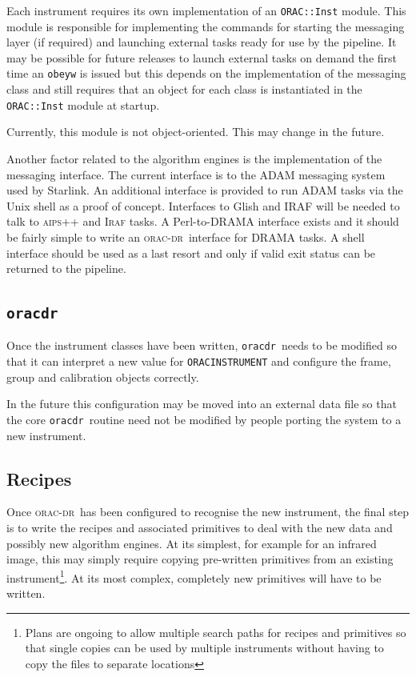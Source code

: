 \documentclass[twoside,11pt]{article}
\renewcommand{\_}{\texttt{\symbol{95}}}
\newcommand{\Oracdr}{\textsc{orac-dr}}
\newcommand{\oracdr}{\texttt{oracdr}}
\begin{document}
Each instrument requires its own implementation of an
\texttt{ORAC::Inst} module. This module is responsible for
implementing the commands for starting the messaging layer (if
required) and launching external tasks ready for use by the
pipeline. It may be possible for future releases to launch
external tasks on demand the first time an \texttt{obeyw} is
issued but this depends on the implementation of the messaging class and 
still requires that an object for each class is instantiated in the
\texttt{ORAC::Inst} module at startup.

Currently, this module is not object-oriented. This may change in the
future.

Another factor related to the algorithm engines is the implementation
of the messaging interface. The current interface is to the 
ADAM messaging system used by Starlink. An additional interface is
provided to run ADAM tasks via the Unix shell as a proof of concept.
Interfaces to Glish and IRAF will be needed to talk to \textsc{aips++}
and \textsc{Iraf} tasks. A Perl-to-DRAMA interface exists and it
should be fairly simple to write an \Oracdr\ interface for
DRAMA tasks. A shell interface should be used as a last
resort and only if valid exit status can be returned to the pipeline.



\subsection{\oracdr}

Once the instrument classes have been written, \oracdr\ needs to be
modified so that it can interpret a new value for
\texttt{ORAC\_INSTRUMENT} and configure the frame, group and
calibration objects correctly.

In the future this configuration may be moved into an external data
file so that the core \oracdr\ routine need not be modified by people
porting the system to a new instrument.

\subsection{Recipes}

Once \Oracdr\ has been configured to recognise the new instrument, the 
final step is to write the recipes and associated primitives to deal
with the new data and possibly new algorithm engines. At its simplest, 
for example for an infrared image, this may simply require copying
pre-written primitives from an existing instrument\footnote{Plans are
ongoing to allow multiple search paths for recipes and primitives so
that single copies can be used by multiple instruments without having
to copy the files to separate locations}.
At its most complex, completely new primitives will have to be written.
\end{document}
